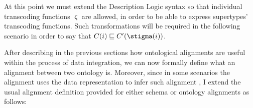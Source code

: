 At this point we must extend the Description Logic syntax so that individual transcoding functions $\stigma$ are allowed, in order to be able to express supertypes' transcoding functions. Such transformations will be required in the following scenario in order to say that  $C(i)\sqsubseteq C'(\transcoding(i))$. %




After describing in the previous sections how ontological alignments are useful within the process of data integration, we can now formally define what an alignment between two ontology is. Moreover, since in some scenarios the alignment uses the data representation to infer such alignment \cite{Aligon201520}, I extend the usual alignment definition provided for either schema or ontology alignments \cite{euzenat2013d,GrossHKR11} as follows:

%
%
%
%

